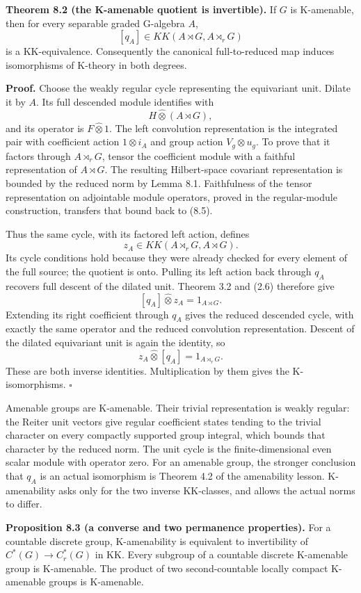 \documentclass[
  11pt,
]{article}
\begin{document}
\textbf{Theorem 8.2 (the K-amenable quotient is invertible).} If \(G\)
is K-amenable, then for every separable graded G-algebra \(A\), \[
[q_A]\in KK(A\rtimes G,A\rtimes_rG)
\tag{8.4}
\] is a KK-equivalence. Consequently the canonical full-to-reduced map
induces isomorphisms of K-theory in both degrees.

\textbf{Proof.} Choose the weakly regular cycle representing the
equivariant unit. Dilate it by \(A\). Its full descended module
identifies with \[
H\widehat\otimes(A\rtimes G),
\tag{8.5}
\] and its operator is \(F\widehat\otimes1\). The left convolution
representation is the integrated pair with coefficient action
\(1\otimes i_A\) and group action \(V_g\otimes u_g\). To prove that it
factors through \(A\rtimes_rG\), tensor the coefficient module with a
faithful representation of \(A\rtimes G\). The resulting Hilbert-space
covariant representation is bounded by the reduced norm by Lemma 8.1.
Faithfulness of the tensor representation on adjointable module
operators, proved in the regular-module construction, transfers that
bound back to (8.5).

Thus the same cycle, with its factored left action, defines \[
z_A\in KK(A\rtimes_rG,A\rtimes G).
\tag{8.6}
\] Its cycle conditions hold because they were already checked for every
element of the full source; the quotient is onto. Pulling its left
action back through \(q_A\) recovers full descent of the dilated unit.
Theorem 3.2 and (2.6) therefore give \[
[q_A]\widehat\otimes z_A=1_{A\rtimes G}.
\tag{8.7}
\] Extending its right coefficient through \(q_A\) gives the reduced
descended cycle, with exactly the same operator and the reduced
convolution representation. Descent of the dilated equivariant unit is
again the identity, so \[
z_A\widehat\otimes[q_A]=1_{A\rtimes_rG}.
\tag{8.8}
\] These are both inverse identities. Multiplication by them gives the
K-isomorphisms. \(\square\)

Amenable groups are K-amenable. Their trivial representation is weakly
regular: the Reiter unit vectors give regular coefficient states tending
to the trivial character on every compactly supported group integral,
which bounds that character by the reduced norm. The unit cycle is the
finite-dimensional even scalar module with operator zero. For an
amenable group, the stronger conclusion that \(q_A\) is an actual
isomorphism is Theorem 4.2 of the amenability lesson. K-amenability asks
only for the two inverse KK-classes, and allows the actual norms to
differ.

\textbf{Proposition 8.3 (a converse and two permanence properties).} For
a countable discrete group, K-amenability is equivalent to invertibility
of \(C^*(G)\to C_r^*(G)\) in KK. Every subgroup of a countable discrete
K-amenable group is K-amenable. The product of two second-countable
locally compact K-amenable groups is K-amenable.
\end{document}

